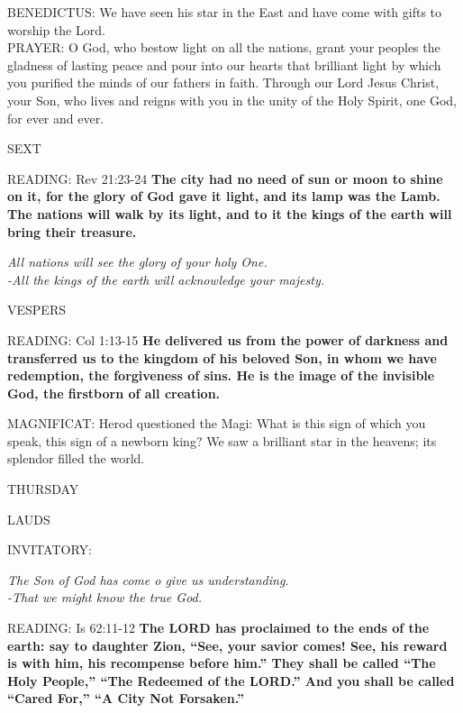 \noindent\small{\uppercase{BENEDICTUS:}}	We have seen his star in the East and have come with gifts to worship the Lord.\\

\noindent\small{\uppercase{PRAYER:}}	O God, who bestow light on all the nations, grant your peoples the gladness of lasting peace and pour into our hearts that brilliant light by which you purified the minds of our fathers in faith. Through our Lord Jesus Christ, your Son, who lives and reigns with you in the unity of the Holy Spirit, one God, for ever and ever.

\begin{flushleft}\normalsize{\uppercase{SEXT\\}}\end{flushleft}
\noindent\small{\uppercase{READING:}}   Rev 21:23-24 \textbf{  The city had no need of sun or moon to shine on it, for the glory of God gave it light, and its lamp was the Lamb. The nations will walk by its light, and to it the kings of the earth will bring their treasure.}
\begin{center}\textit{All nations will see the glory of your holy One.\\
-All the kings of the earth will acknowledge your majesty.}\end{center}

\begin{flushleft}\normalsize{\uppercase{VESPERS\\}}\end{flushleft}
\noindent\small{\uppercase{READING:}}   Col 1:13-15 \textbf{  He delivered us from the power of darkness and transferred us to the kingdom of his beloved Son, in whom we have redemption, the forgiveness of sins. He is the image of the invisible God, the firstborn of all creation.\\}

\noindent\small{\uppercase{MAGNIFICAT:}}	Herod questioned the Magi: What is this sign of which you speak, this sign of a newborn king? We saw a brilliant star in the heavens; its splendor filled the world.\\

\begin{center}
\normalsize THURSDAY
\end{center}

\begin{flushleft}\normalsize{\uppercase{LAUDS\\}}\end{flushleft}
\small{\uppercase{INVITATORY:}}\normalsize
\begin{center}
\textit{The Son of God has come o give us understanding.\\}
\textit{-That we might know the true God.\\}
\end{center}
\noindent\small{\uppercase{READING:}}    Is 62:11-12 \textbf{   The LORD has proclaimed to the ends of the earth: say to daughter Zion, “See, your savior comes! See, his reward is with him, his recompense before him.” They shall be called “The Holy People,” “The Redeemed of the LORD.” And you shall be called “Cared For,” “A City Not Forsaken.”\\}

